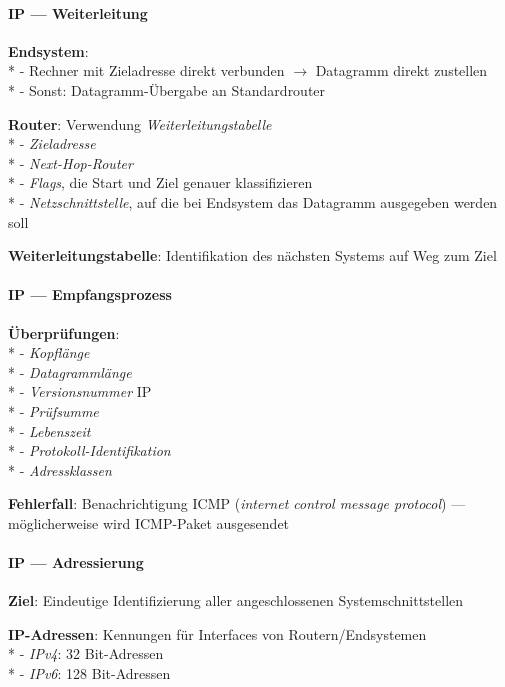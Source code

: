 \paragraph{IP --- Weiterleitung}
\begin{items}
  \item \textbf{Endsystem}: \\*
    - Rechner mit Zieladresse direkt verbunden \( \to \) Datagramm direkt zustellen \\*
    - Sonst: Datagramm-Übergabe an Standardrouter
  \item \textbf{Router}: Verwendung \emph{Weiterleitungstabelle} \\*
    - \emph{Zieladresse} \\*
    - \emph{Next-Hop-Router} \\*
    - \emph{Flags}, die Start und Ziel genauer klassifizieren \\*
    - \emph{Netzschnittstelle}, auf die bei Endsystem das Datagramm ausgegeben werden soll
  \item \textbf{Weiterleitungstabelle}: Identifikation des nächsten Systems auf Weg zum Ziel
\end{items}

\paragraph{IP --- Empfangsprozess}
\begin{items}
  \item \textbf{Überprüfungen}: \\* 
    - \emph{Kopflänge} \\*
    - \emph{Datagrammlänge} \\*
    - \emph{Versionsnummer} IP \\*
    - \emph{Prüfsumme} \\*
    - \emph{Lebenszeit} \\*
    - \emph{Protokoll-Identifikation} \\*
    - \emph{Adressklassen}
  \item \textbf{Fehlerfall}: Benachrichtigung ICMP (\emph{internet control message protocol}) --- möglicherweise wird ICMP-Paket ausgesendet
\end{items}

\paragraph{IP --- Adressierung}
\begin{items}
  \item \textbf{Ziel}: Eindeutige Identifizierung aller angeschlossenen Systemschnittstellen
  \item \textbf{IP-Adressen}: Kennungen für Interfaces von Routern/Endsystemen \\*
    - \emph{IPv4}: 32 Bit-Adressen \\*
    - \emph{IPv6}: 128 Bit-Adressen
\end{items}

